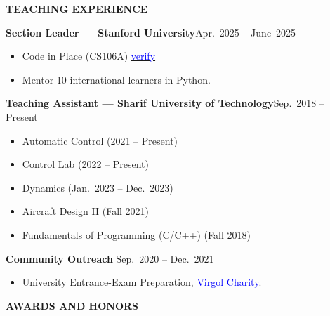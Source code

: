 \documentclass[12pt]{article}
\begin{document}
\begin{center}
	{\noindent \bfseries TEACHING EXPERIENCE}
\end{center}
\vspace{-6pt}
\noindent\textbf{Section Leader — Stanford University}\hfill Apr.\ 2025 -- June\ 2025
\begin{itemize}
  \setlength\itemsep{-2pt}
  \vspace{-4pt}
  \item Code in Place (CS106A) \href{https://digitalcredential.stanford.edu/check/12C01708B752FCC7EF2B1086A984BE4DB81F8FA5052AAF37FD7715630739E31Ad0RoWDlqaUxONEpuYWxHdXRtNkc0dmQrZCtXMjZFVDRoMDRib0hmV2FWaVVXbWV1}{\textcolor{blue}{verify}}
  \item Mentor 10 international learners in Python. %
\end{itemize}
\vspace{-4pt}
\noindent\textbf{Teaching Assistant — Sharif University of Technology}\hfill Sep.\ 2018 – Present
\begin{itemize}
  \setlength\itemsep{-2pt}       %
  \vspace{-4pt}
  \item Automatic Control (2021 – Present)
  \item Control Lab (2022 – Present)
  \item Dynamics (Jan.\ 2023 – Dec.\ 2023)
  \item Aircraft Design II (Fall 2021)
  \item Fundamentals of Programming (C/C++) (Fall 2018)
\end{itemize}
\vspace{-4pt}
\noindent\textbf{Community Outreach} \hfill Sep.\ 2020 -- Dec.\ 2021
\vspace{-6pt}
\begin{itemize}
  \setlength\itemsep{-2pt}
  \item University Entrance-Exam Preparation, %
  \href{https://www.instagram.com/virgool_charity?igsh=MWxsOGF3cTk1dzY3dw==}{\textcolor{blue}{Virgol Charity}}.%
\end{itemize}




\begin{center}
	{\noindent \bfseries AWARDS AND HONORS}
\end{center}
\end{document}
